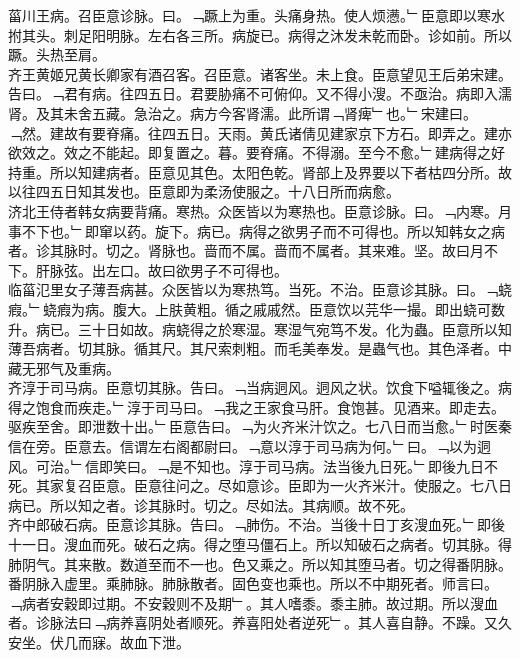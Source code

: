 \documentclass{zhvt-classic}
\begin{document}
\hspace*{2em}菑川王病。召臣意诊脉。曰。﹁蹶上为重。头痛身热。使人烦懑。﹂臣意即以寒水拊其头。刺足阳明脉。左右各三所。病旋已。病得之沐发未乾而卧。诊如前。所以蹶。头热至肩。\\
\hspace*{2em}齐王黄姬兄黄长卿家有酒召客。召臣意。诸客坐。未上食。臣意望见王后弟宋建。告曰。﹁君有病。往四五日。君要胁痛不可俯仰。又不得小溲。不亟治。病即入濡肾。及其未舍五藏。急治之。病方今客肾濡。此所谓﹁肾痺﹂也。﹂宋建曰。﹁然。建故有要脊痛。往四五日。天雨。黄氏诸倩见建家京下方石。即弄之。建亦欲效之。效之不能起。即复置之。暮。要脊痛。不得溺。至今不愈。﹂建病得之好持重。所以知建病者。臣意见其色。太阳色乾。肾部上及界要以下者枯四分所。故以往四五日知其发也。臣意即为柔汤使服之。十八日所而病愈。\\
\hspace*{2em}济北王侍者韩女病要背痛。寒热。众医皆以为寒热也。臣意诊脉。曰。﹁内寒。月事不下也。﹂即窜以药。旋下。病已。病得之欲男子而不可得也。所以知韩女之病者。诊其脉时。切之。肾脉也。啬而不属。啬而不属者。其来难。坚。故曰月不下。肝脉弦。出左口。故曰欲男子不可得也。\\
\hspace*{2em}临菑氾里女子薄吾病甚。众医皆以为寒热笃。当死。不治。臣意诊其脉。曰。﹁蛲瘕。﹂蛲瘕为病。腹大。上肤黄粗。循之戚戚然。臣意饮以芫华一撮。即出蛲可数升。病已。三十日如故。病蛲得之於寒湿。寒湿气宛笃不发。化为蟲。臣意所以知薄吾病者。切其脉。循其尺。其尺索刺粗。而毛美奉发。是蟲气也。其色泽者。中藏无邪气及重病。\\
\hspace*{2em}齐淳于司马病。臣意切其脉。告曰。﹁当病迵风。迵风之状。饮食下嗌辄後之。病得之饱食而疾走。﹂淳于司马曰。﹁我之王家食马肝。食饱甚。见酒来。即走去。驱疾至舍。即泄数十出。﹂臣意告曰。﹁为火齐米汁饮之。七八日而当愈。﹂时医秦信在旁。臣意去。信谓左右阁都尉曰。﹁意以淳于司马病为何。﹂曰。﹁以为迵风。可治。﹂信即笑曰。﹁是不知也。淳于司马病。法当後九日死。﹂即後九日不死。其家复召臣意。臣意往问之。尽如意诊。臣即为一火齐米汁。使服之。七八日病已。所以知之者。诊其脉时。切之。尽如法。其病顺。故不死。\\
\hspace*{2em}齐中郎破石病。臣意诊其脉。告曰。﹁肺伤。不治。当後十日丁亥溲血死。﹂即後十一日。溲血而死。破石之病。得之堕马僵石上。所以知破石之病者。切其脉。得肺阴气。其来散。数道至而不一也。色又乘之。所以知其堕马者。切之得番阴脉。番阴脉入虚里。乘肺脉。肺脉散者。固色变也乘也。所以不中期死者。师言曰。﹁病者安穀即过期。不安穀则不及期﹂。其人嗜黍。黍主肺。故过期。所以溲血者。诊脉法曰﹁病养喜阴处者顺死。养喜阳处者逆死﹂。其人喜自静。不躁。又久安坐。伏几而寐。故血下泄。\\
\end{document}
